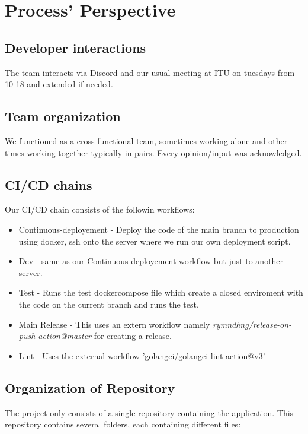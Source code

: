 \section{Process' Perspective}

\subsection{Developer interactions}
The team interacts via Discord and our usual meeting at ITU on tuesdays from 10-18 and extended if needed.

\subsection{Team organization}
We functioned as a cross functional team, sometimes working alone and other times working together typically in pairs. Every opinion/input was acknowledged. 

\subsection{CI/CD chains}
Our CI/CD chain consists of the followin workflows:
\begin{itemize}
    \item Continuous-deployement - Deploy the code of the main branch to production using docker, ssh onto the server where we run our own deployment script.
    \item Dev - same as our Continuous-deployement workflow but just to another server.
    \item Test - Runs the test dockercompose file which create a closed enviroment with the code on the current branch and runs the test.
    \item Main Release - This uses an extern workflow namely \textit{rymndhng/release-on-push-action@master} for creating a release.
    \item Lint - Uses the external workflow 'golangci/golangci-lint-action@v3'
\end{itemize}

\subsection{Organization of Repository}
The project only consists of a single repository containing the application. This repository contains several folders, 
each containing different files: \\

